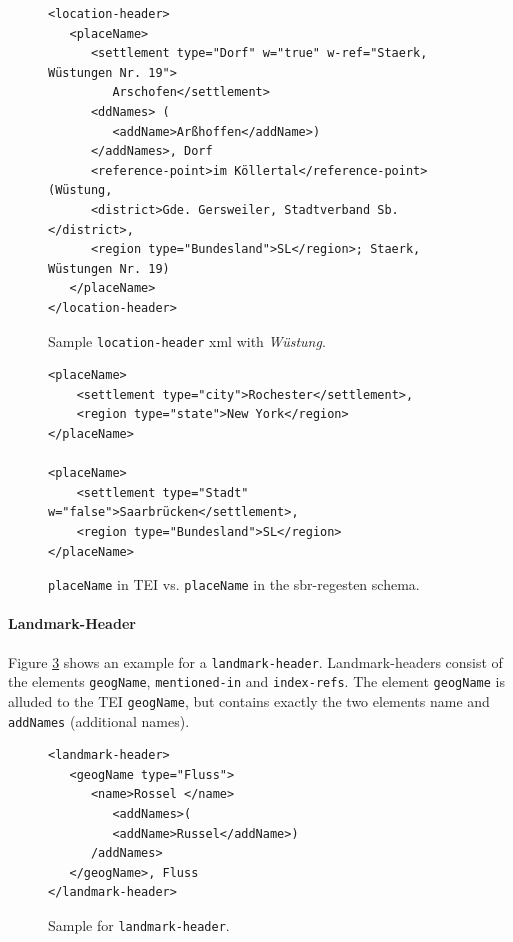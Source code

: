 \begin{figure}[H]
\begin{verbatim}
<location-header>
   <placeName>
      <settlement type="Dorf" w="true" w-ref="Staerk, Wüstungen Nr. 19">
         Arschofen</settlement>
      <ddNames> (
         <addName>Arßhoffen</addName>)
      </addNames>, Dorf 
      <reference-point>im Köllertal</reference-point> (Wüstung, 
      <district>Gde. Gersweiler, Stadtverband Sb.</district>, 
      <region type="Bundesland">SL</region>; Staerk, Wüstungen Nr. 19) 
   </placeName>
</location-header>
\end{verbatim}
\label{fig:location-wuest-xml}
\caption{Sample \texttt{location-header} xml with \textit{Wüstung}.}
\end{figure}

\begin{figure}[H]
\begin{verbatim}
<placeName>
    <settlement type="city">Rochester</settlement>,
    <region type="state">New York</region>
</placeName>

<placeName>
    <settlement type="Stadt" w="false">Saarbrücken</settlement>,
    <region type="Bundesland">SL</region>
</placeName>
\end{verbatim}
\label{fig:placeName}
\caption{\texttt{placeName} in TEI vs. \texttt{placeName} in the sbr-regesten schema.}
\end{figure}


\paragraph{Landmark-Header}
Figure \ref{fig:landmark-header-xml} shows an example for a \texttt{landmark-header}. Landmark-headers consist of the elements \texttt{geogName}, \texttt{mentioned-in} and \texttt{index-refs}. The element \texttt{geogName} is alluded to the TEI \texttt{geogName}, but contains exactly the two elements name and \texttt{addNames} (additional names).

\begin{figure}[H]
\begin{verbatim}
<landmark-header>
   <geogName type="Fluss">
      <name>Rossel </name>
         <addNames>(
         <addName>Russel</addName>)
      /addNames>
   </geogName>, Fluss 
</landmark-header>
\end{verbatim}
\label{fig:landmark-header-xml}
\caption{Sample for \texttt{landmark-header}.}
\end{figure}

